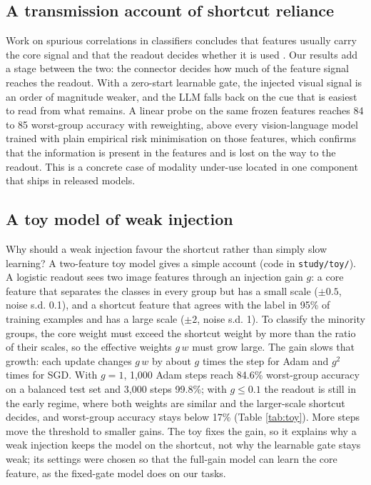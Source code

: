 \subsection{A transmission account of shortcut reliance}

Work on spurious correlations in classifiers concludes that features usually carry the core signal and that the
readout decides whether it is used \citep{izmailov2022feature,kirichenko2023dfr}. Our results add a stage between the two:
the connector decides how much of the feature signal reaches the readout. With a zero-start learnable gate, the
injected visual signal is an order of magnitude weaker, and the LLM falls back on the cue that is easiest to read
from what remains. A linear probe on the same frozen features reaches 84 to 85 worst-group accuracy with reweighting,
above every vision-language model trained with plain empirical risk minimisation on those features, which confirms that the information is present in the features and is lost on the way to
the readout. This is a concrete case of modality under-use \citep{wu2022greedy,huang2022modality} located in one component
that ships in released models.

\subsection{A toy model of weak injection}

Why should a weak injection favour the shortcut rather than simply slow learning? A two-feature toy model gives a
simple account (code in \texttt{study/toy/}). A logistic readout sees two image features through an injection gain \(g\): a
core feature that separates the classes in every group but has a small scale (\(\pm 0.5\), noise s.d. 0.1), and a
shortcut feature that agrees with the label in 95\% of training examples and has a large scale (\(\pm 2\), noise s.d.
1). To classify the minority groups, the core weight must exceed the shortcut weight by more than the ratio of
their scales, so the effective weights \(g\,w\) must grow large. The gain slows that growth: each update changes
\(g\,w\) by about \(g\) times the step for Adam and \(g^2\) times for SGD. With \(g = 1\), 1,000 Adam steps reach 84.6\%
worst-group accuracy on a balanced test set and 3,000 steps 99.8\%; with \(g \le 0.1\) the readout is still in the
early regime, where both weights are similar and the larger-scale shortcut decides, and worst-group accuracy stays
below 17\% (Table \ref{tab:toy}). More steps move the threshold to smaller gains. The toy fixes the gain, so it explains why a weak injection keeps the model on the shortcut, not why the
learnable gate stays weak; its settings were chosen so that the full-gain model can learn the core feature, as the
fixed-gate model does on our tasks.

